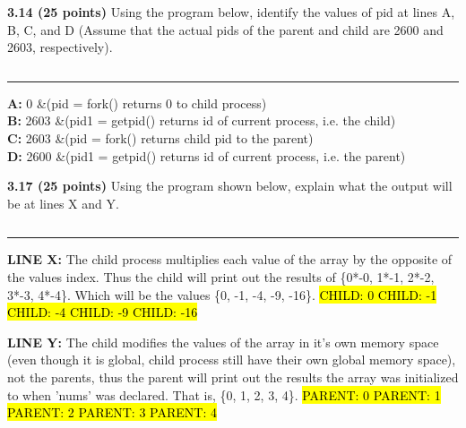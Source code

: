 \documentclass[12pt]{jhwhw}
\begin{document}
\bigbreak
\textbf{3.14 (25 points)} Using the program below, identify the values of pid at
	lines A, B, C, and D (Assume that the actual pids of the parent and child
	are 2600 and 2603, respectively).
\inputminted{c}{3.14.c}
\textcolor[RGB]{240,240,240}{\rule{\textwidth}{0.5pt}}\bigbreak

	\begin{addmargin}[1em]{}
		\textbf{A:} 0 &(pid = fork() returns 0 to child process) \\
		\textbf{B:} 2603 &(pid1 = getpid() returns id of current process, i.e. the child) \\
		\textbf{C:} 2603 &(pid = fork() returns child pid to the parent) \\
		\textbf{D:} 2600 &(pid1 = getpid() returns id of current process, i.e. the parent)\\
	\end{addmargin}

\bigbreak
\textbf{3.17 (25 points)} Using the program shown below, explain what the output will be
	at lines X and Y.
\inputminted{c}{3.17.c}
\textcolor[RGB]{240,240,240}{\rule{\textwidth}{0.5pt}}\bigbreak

	\begin{addmargin}[1em]{}
		\textbf{LINE X:} The child process multiplies each value of the array by the opposite
		of the values index. Thus the child will print out the results of
		\{0*-0, 1*-1, 2*-2, 3*-3, 4*-4\}. Which will be the values
		\{0, -1, -4, -9, -16\}.
		\bigbreak
		\hl{CHILD: 0 CHILD: -1 CHILD: -4 CHILD: -9 CHILD: -16}

		\textbf{LINE Y:} The child modifies the values of the array in it's own memory space
		(even though it is global, child process still have their own global memory space),
		not the parents, thus the parent will print out the results the array was
		initialized to when 'nums' was declared. That is, \{0, 1, 2, 3, 4\}.
		\bigbreak
		\hl{PARENT: 0 PARENT: 1 PARENT: 2 PARENT: 3 PARENT: 4}
	\end{addmargin}
\end{document}
